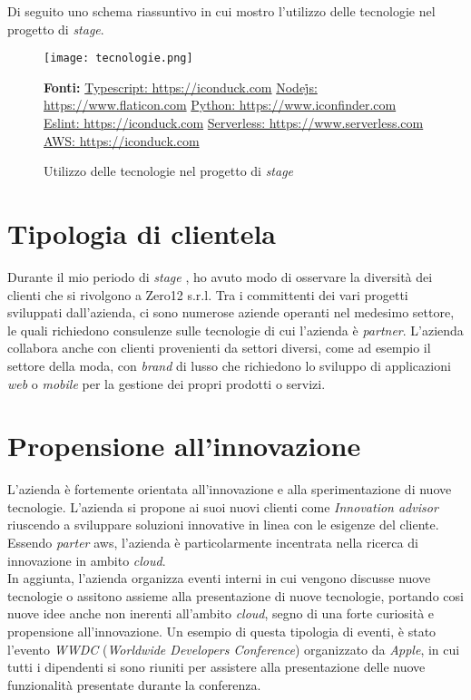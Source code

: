 
\noindent
Di seguito uno schema riassuntivo in cui mostro l'utilizzo delle tecnologie nel progetto di \textit{stage}.
\begin{figure}[H]
    \centering
    \texttt{[image: tecnologie.png]}
    \caption{Utilizzo delle tecnologie nel progetto di \textit{stage}}
    \label{fig:tecnologie}
    \small \textbf{Fonti:} \href{https://iconduck.com/icons/95017/typescript-icon}{Typescript: https://iconduck.com} \href{https://www.flaticon.com/free-icon/nodejs_919825}{Node\.js: https://www.flaticon.com} \href{https://www.iconfinder.com/icons/4518857/python_icon} {Python: https://www.iconfinder.com} \href{https://iconduck.com/icons/94274/eslint} {Eslint: https://iconduck.com} \href{https://www.serverless.com/} {Serverless: https://www.serverless.com} \href{https://iconduck.com/icons/10826/amazon-aws} {AWS: https://iconduck.com}
\end{figure}
\section{Tipologia di clientela}
Durante il mio periodo di \textit{stage} , ho avuto modo di osservare la diversità dei clienti che si rivolgono a Zero12 s.r.l. Tra i committenti dei vari progetti sviluppati dall'azienda, ci sono numerose aziende operanti nel medesimo settore, le quali richiedono consulenze sulle tecnologie di cui l'azienda è \textit{partner}.
L'azienda collabora anche con clienti provenienti da settori diversi, come ad esempio il settore della moda, con \textit{brand} di lusso che richiedono lo sviluppo di applicazioni \textit{web} o \textit{mobile} per la gestione dei propri prodotti o servizi.

\section{Propensione all'innovazione}
L'azienda è fortemente orientata all'innovazione e alla sperimentazione di nuove tecnologie.
L'azienda si propone ai suoi nuovi clienti come \textit{Innovation advisor} riuscendo a sviluppare soluzioni innovative in linea con le esigenze del cliente. Essendo \textit{parter} \gls{aws}, l'azienda è particolarmente incentrata nella ricerca di innovazione in ambito \textit{cloud}.\\
In aggiunta, l'azienda organizza eventi interni in cui vengono discusse nuove tecnologie o assitono assieme alla presentazione di nuove tecnologie, portando cosi nuove idee anche non inerenti all'ambito \textit{cloud}, segno di una forte curiosità e propensione all'innovazione. Un esempio di questa tipologia di eventi, è stato l'evento \textit{WWDC} (\textit{Worldwide Developers Conference}) organizzato da \textit{Apple}, in cui tutti i dipendenti si sono riuniti per assistere alla presentazione delle nuove funzionalità presentate durante la conferenza.

